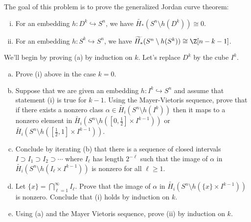 \documentclass[11pt,letterpaper]{article}
\begin{document}
\begin{problem}
    The goal of this problem is to prove the generalized Jordan curve theorem:
    \begin{enumerate}[(i)]
        \item For an embedding $h : D^k \hookrightarrow S^n$, we have $\widetilde{H_*}(S^n \setminus h(D^k))\cong 0$.
        \item For an embedding $h : S^k \hookrightarrow S^n$, we have $\widetilde{H_*}(S^n \setminus h(S^k))\cong \Z[n-k-1]$.   
    \end{enumerate}
    We'll begin by proving (a) by induction on $k$. Let's replace $D^k$ by the cube $I^k$.
    \begin{enumerate}[(a)]
        \item Prove (i) above in the case $k=0$.
        \item Suppose that we are given an embedding $h : I^k \hookrightarrow S^n$ and assume that statement (i) is true for $k-1$. Using the Mayer-Vietoris sequence, prove that if there exists a nonzero class $\alpha \in \widetilde{H_i}(S^n\setminus h(I^k))$ then it maps to a nonzero element in $\widetilde{H_i}(S^n\setminus h([0, \frac{1}{2}]\times I^{k-1}))$ or $\widetilde{H_i}(S^n\setminus h([\frac{1}{2}, 1]\times I^{k-1}))$.
        \item Conclude by iterating (b) that there is a sequence of closed intervals $I \supset I_1 \supset I_2 \supset \cdots$ where $I_\ell$ has length $2^{-\ell}$ such that the image of $\alpha$ in $\widetilde{H_i}(S^n \setminus h(I_\ell \times I^{k-1}))$ is nonzero for all $\ell\geq 1$.
        \item Let $\{x\}=\bigcap^\infty_{\ell=1}I_\ell$. Prove that the image of $\alpha$ in $\widetilde{H_i}(S^n\setminus h(\{x\}\times I^{k-1}))$ is nonzero. Conclude that (i) holds by induction on $k$.
        \item Using (a) and the Mayer Vietoris sequence, prove (ii) by induction on $k$.
    \end{enumerate}
\end{problem}
\end{document}
